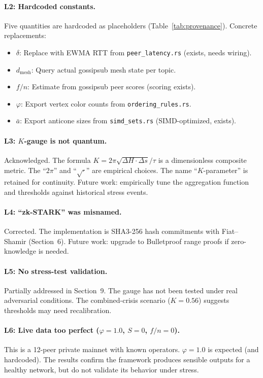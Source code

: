 \documentclass[11pt,a4paper,twocolumn]{article}
\begin{document}
\paragraph{L2: Hardcoded constants.} Five quantities are hardcoded as placeholders (Table~\ref{tab:provenance}). Concrete replacements:
\begin{itemize}[nosep]
    \item $\delta$: Replace with EWMA RTT from \texttt{peer\_latency.rs} (exists, needs wiring).
    \item $d_{\text{mesh}}$: Query actual gossipsub mesh state per topic.
    \item $f/n$: Estimate from gossipsub peer scores (scoring exists).
    \item $\varphi$: Export vertex color counts from \texttt{ordering\_rules.rs}.
    \item $\bar{a}$: Export anticone sizes from \texttt{simd\_sets.rs} (SIMD-optimized, exists).
\end{itemize}

\paragraph{L3: $K$-gauge is not quantum.} Acknowledged. The formula $K = 2\pi\sqrt{\Delta H \cdot \Delta s}/\tau$ is a dimensionless composite metric. The ``$2\pi$'' and ``$\sqrt{\cdot}$'' are empirical choices. The name ``$K$-parameter'' is retained for continuity. Future work: empirically tune the aggregation function and thresholds against historical stress events.

\paragraph{L4: ``zk-STARK'' was misnamed.} Corrected. The implementation is SHA3-256 hash commitments with Fiat--Shamir (Section~6). Future work: upgrade to Bulletproof range proofs if zero-knowledge is needed.

\paragraph{L5: No stress-test validation.} Partially addressed in Section~9. The gauge has not been tested under real adversarial conditions. The combined-crisis scenario ($K = 0.56$) suggests thresholds may need recalibration.

\paragraph{L6: Live data too perfect ($\varphi = 1.0$, $S = 0$, $f/n = 0$).} This is a 12-peer private mainnet with known operators. $\varphi = 1.0$ is expected (and hardcoded). The results confirm the framework produces sensible outputs for a healthy network, but do not validate its behavior under stress.
\end{document}
